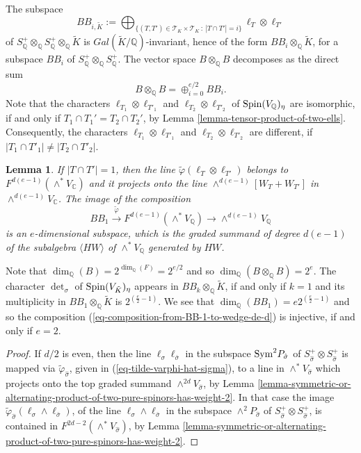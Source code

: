 \documentclass[12pt]{amsart}
\numberwithin{equation}{subsection}
\theoremstyle{plain}
\newtheorem{lem}[thm]{Lemma}
\theoremstyle{definition}
\newcommand{\CC}{{\mathbb C}}
\newcommand{\QQ}{{\mathbb Q}}
\newcommand{\T}{{\mathcal T}}
\newcommand{\Spin}{{\rm Spin}}
\newcommand{\RightArrowOf}[1]{\stackrel{#1}{\rightarrow}}
\newcommand{\Sym}{{\rm Sym}}
\begin{document}
{The subspace
\[
BB_{i,\tilde{K}} := \bigoplus_{\{(T,T')\in \T_K\times\T_K \ : \ |T\cap T'|=i\}}\ell_T\otimes\ell_{T'}
\]
of $S^+_\QQ\otimes_\QQ S^+_\QQ\otimes_\QQ \tilde{K}$ is $Gal(\tilde{K}/\QQ)$-invariant, hence of the form $BB_i\otimes_\QQ\tilde{K}$, for a subspace $BB_i$ of $S^+_\QQ\otimes_\QQ S^+_\QQ$.
The vector space $B\otimes_\QQ B$ decomposes as the direct sum
\[
B\otimes_\QQ B = \oplus_{i=0}^{e/2} BB_i.
\]
Note that the characters $\ell_{T_1}\otimes\ell_{T'_1}$ and $\ell_{T_2}\otimes\ell_{T'_2}$ of $\Spin(V_\QQ)_\eta$ are isomorphic, if and only if 
$T_1\cap T_1'=T_2\cap T_2'$, by Lemma \ref{lemma-tensor-product-of-two-ells}. Consequently, the characters $\ell_{T_1}\otimes\ell_{T'_1}$ and $\ell_{T_2}\otimes\ell_{T'_2}$ are different, if $|T_1\cap T'_1|\neq |T_2\cap T'_2|.$

\begin{lem}
\label{lemma-on-lines-tensor-ell-T-ell-T-prime}
If $|T\cap T'|=1$, then the line $\tilde{\varphi}(\ell_T\otimes\ell_{T'})$ belongs to $F^{d(e-1)}(\wedge^*V_\CC)$ and it projects onto the line
$\wedge^{d(e-1)}[W_T+W_{T'}]$ in $\wedge^{d(e-1)}V_\CC$. The image of the composition 
\begin{equation}
\label{eq-composition-from-BB-1-to-wedge-de-d}
BB_1\RightArrowOf{\tilde{\varphi}}F^{d(e-1)}(\wedge^*V_\QQ)\rightarrow \wedge^{d(e-1)}V_\QQ
\end{equation}
is an $e$-dimensional subspace, which is the graded summand of degree $d(e-1)$ of the subalgebra $\langle HW\rangle$ of $\wedge^*V_\QQ$ generated by $HW$.
\end{lem}

Note that $\dim_\QQ(B)=2^{\dim_\QQ(F)}=2^{e/2}$ and so $\dim_\QQ(B\otimes_\QQ B)=2^e$. 
The character $\det_\sigma$ of $\Spin(V_{\tilde{K}})_\eta$ appears in $BB_k\otimes_\QQ\tilde{K}$, 
if and only if $k=1$ and its multiplicity in $BB_1\otimes_\QQ\tilde{K}$ is $2^{(\frac{e}{2}-1)}$. 
We see that $\dim_\QQ(BB_1)=e2^{(\frac{e}{2}-1)}$
and so the composition (\ref{eq-composition-from-BB-1-to-wedge-de-d}) is injective, if and only if $e=2$.


\begin{proof}
If $d/2$ is even, then the line $\ell_\sigma\ell_{\bar{\sigma}}$ in the subspace $\Sym^2P_{\hat{\sigma}}$ of $S^+_{\hat{\sigma}}\otimes S^+_{\hat{\sigma}}$ is mapped via $\tilde{\varphi}_{\hat{\sigma}}$, given in (\ref{eq-tilde-varphi-hat-sigma}), to a line in $\wedge^*V_{\hat{\sigma}}$ which 
projects onto the top graded summand $\wedge^{2d}V_{\hat{\sigma}}$, by Lemma \ref{lemma-symmetric-or-alternating-product-of-two-pure-spinors-has-weight-2}. 
In that case the image $\tilde{\varphi}_{\hat{\sigma}}(\ell_\sigma\wedge \ell_{\bar{\sigma}})$, of the line $\ell_\sigma\wedge \ell_{\bar{\sigma}}$ in the subspace $\wedge^2P_{\hat{\sigma}}$ of $S^+_{\hat{\sigma}}\otimes S^+_{\hat{\sigma}}$, 
is contained in $F^{2d-2}(\wedge^*V_{\hat{\sigma}})$, by Lemma \ref{lemma-symmetric-or-alternating-product-of-two-pure-spinors-has-weight-2}. 


\end{proof}}
\end{document}

